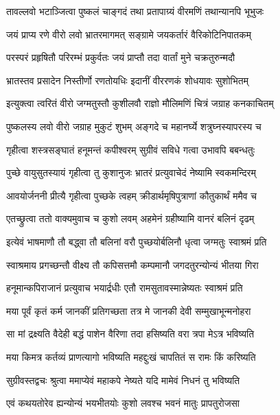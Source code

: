 \twolineshloka
{तावल्लवो भटाञ्जित्वा पुष्कलं चाङ्गदं तथा}
{प्रतापाग्र्यं वीरमणिं तथान्यानपि भूभुजः}%

\twolineshloka
{जयं प्राप्य रणे वीरो लवो भ्रातरमागमत्}
{सङ्ग्रामे जयकर्तारं वैरिकोटिनिपातकम्}%

\twolineshloka
{परस्परं प्रहृषितौ परिरम्भं प्रकुर्वतः}
{जयं प्राप्तौ तदा वार्तां मुने चक्रतुरुन्मदौ}%


\twolineshloka
{भ्रातस्तव प्रसादेन निस्तीर्णो रणतोयधिः}
{इदानीं वीररणकं शोधयावः सुशोभितम्}%

\twolineshloka
{इत्युक्त्वा त्वरितं वीरो जग्मतुस्तौ कुशीलवौ}
{राज्ञो मौलिमणिं चित्रं जग्राह कनकाचितम्}%

\twolineshloka
{पुष्कलस्य लवो वीरो जग्राह मुकुटं शुभम्}
{अङ्गदे च महानर्घ्ये शत्रुघ्नस्यापरस्य च}%

\twolineshloka
{गृहीत्वा शस्त्रसङ्घातं हनूमन्तं कपीश्वरम्}
{सुग्रीवं सविधे गत्वा उभावपि बबन्धतुः}%

\twolineshloka
{पुच्छे वायुसुतस्यायं गृहीत्वा तु कुशानुजः}
{भ्रातरं प्रत्युवाचेदं नेष्यामि स्वकमन्दिरम्}%

\twolineshloka
{आवयोर्जननी प्रीत्यै गृहीत्वा पुच्छके त्वहम्}
{क्रीडार्थमृषिपुत्राणां कौतुकार्थं ममैव च}%

\twolineshloka
{एतच्छ्रुत्वा ततो वाक्यमुवाच च कुशो लवम्}
{अहमेनं ग्रहीष्यामि वानरं बलिनं दृढम्}%

\twolineshloka
{इत्येवं भाषमाणौ तौ बद्ध्वा तौ बलिनां वरौ}
{पुच्छयोर्बलिनौ धृत्वा जग्मतुः स्वाश्रमं प्रति}%

\twolineshloka
{स्वाश्रमाय प्रगच्छन्तौ वीक्ष्य तौ कपिसत्तमौ}
{कम्पमानौ जगदतुरन्योन्यं भीतया गिरा}%

\twolineshloka
{हनूमान्कपिराजानं प्रत्युवाच भयार्द्रधीः}
{एतौ रामसुतावस्मान्नेष्यतः स्वाश्रमं प्रति}%

\twolineshloka
{मया पूर्वं कृतं कर्म जानकीं प्रतिगच्छता}
{तत्र मे जानकी देवी सम्मुखाभून्मनोहरा}%

\twolineshloka
{सा मां द्रक्ष्यति वैदेही बद्धं पाशेन वैरिणा}
{तदा हसिष्यति वरा त्रपा मेऽत्र भविष्यति}%

\twolineshloka
{मया किमत्र कर्तव्यं प्राणत्यागो भविष्यति}
{महद्दुःखं चापतितं स रामः किं करिष्यति}%

\twolineshloka
{सुग्रीवस्तद्वचः श्रुत्वा ममाप्येवं महाकपे}
{नेष्यते यदि मामेवं निधनं तु भविष्यति}%

\twolineshloka
{एवं कथयतोरेव ह्यन्योन्यं भयभीतयोः}
{कुशो लवश्च भवनं मातुः प्रापतुरोजसा}%

